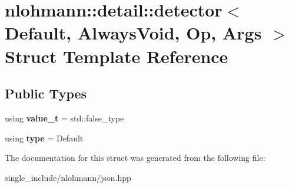 \hypertarget{structnlohmann_1_1detail_1_1detector}{}\section{nlohmann\+:\+:detail\+:\+:detector$<$ Default, Always\+Void, Op, Args $>$ Struct Template Reference}
\label{structnlohmann_1_1detail_1_1detector}
\subsection*{Public Types}
\begin{DoxyCompactItemize}
\item 
\mbox{\label{structnlohmann_1_1detail_1_1detector_a5a132aab543d1706e2439268faf8d487}} 
using {\bfseries value\+\_\+t} = std\+::false\+\_\+type
\item 
\mbox{\label{structnlohmann_1_1detail_1_1detector_a0cd69423587748bf3d3d702cc7b7c2ce}} 
using {\bfseries type} = Default
\end{DoxyCompactItemize}


The documentation for this struct was generated from the following file\+:\begin{DoxyCompactItemize}
\item 
single\+\_\+include/nlohmann/json.\+hpp\end{DoxyCompactItemize}
